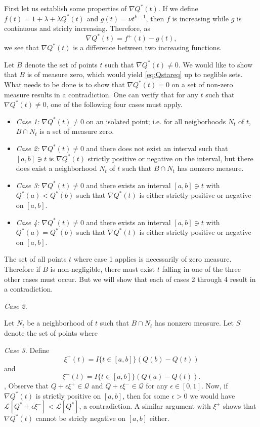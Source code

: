 \documentclass[12pt]{article}
\begin{document}
First let us establish some properties of $\nabla Q^*(t)$.  
If we define $f(t) = 1+ \lambda + \lambda Q^*(t)$
and $g(t) = \nu t^{k-1}$, then $f$ is increasing while $g$ is continuous and stricly increasing.
Therefore, as
\[
\nabla Q^*(t) = f^+(t) - g(t),
\]
we see that $\nabla Q^*(t)$ is a difference between two increasing
functions.






Let $B$ denote the set of points $t$ such that $\nabla Q^*(t) \neq 0$.
We would like to show that $B$ is of measure zero, which would
yield \eqref{eq:Qstareq} up to neglible sets.  What needs to be done
is to show that $\nabla Q^*(t) = 0$ on a set of non-zero measure
results in a contradiction.  One can verify that for any $t$ such that
$\nabla Q^*(t) \neq 0$, one of the following four cases must apply.
\begin{itemize}
\item \emph{Case 1:} $\nabla Q^*(t) \neq 0$ on an isolated point; i.e. for all neigborhoods $N_t$ of $t$, $B \cap N_t$ is a set of measure zero.
\item \emph{Case 2:} $\nabla Q^*(t) \neq 0$ and there does not exist an interval such that
$[a, b] \ni t$ is $\nabla Q^*(t)$ strictly positive or negative on the
interval, but there does exist a neighborhood $N_t$ of $t$ such that $B \cap N_t$ has nonzero measure.
\item \emph{Case 3:}  $\nabla Q^*(t) \neq 0$ and there exists an interval
 $[a, b] \ni t$ with $Q^*(a) < Q^*(b)$ such that $\nabla Q^*(t)$ is
 either strictly positive or negative on $[a,b]$.
\item \emph{Case 4:} $\nabla Q^*(t) \neq 0$ and there exists an interval
 $[a, b] \ni t$ with $Q^*(a) = Q^*(b)$ such that $\nabla Q^*(t)$ is
 either strictly positive or negative on $[a,b]$.
\end{itemize}
The set of all points $t$ where case 1 applies is necessarily of zero
measure.  Therefore if $B$ is non-negligible, there must exist $t$
falling in one of the three other cases must occur.  But we will show that 
each of cases 2 through 4 result in a contradiction.

\emph{Case 2.}


Let $N_t$ be a neighborhood of $t$ such that $B \cap N_t$ has nonzero
measure.  Let $S$ denote the set of points where 


\emph{Case 3.}
Define
\[
\xi^+(t) = I\{t \in [a,b]\} (Q(b) - Q(t))
\]
and
\[
\xi^-(t) = I\{t \in [a,b]\} (Q(a) - Q(t)).
\],
Observe that $Q + \epsilon \xi^+ \in \mathcal{Q}$ and $Q
+ \epsilon \xi^- \in \mathcal{Q}$ for any $\epsilon \in [0,1]$.  Now,
if $\nabla Q^*(t)$ is strictly positive on $[a,b]$, then for some
$\epsilon > 0$ we would have $\mathcal{L}[Q^* + \epsilon \xi^-]
< \mathcal{L}[Q^*]$, a contradiction.  A similar argument with $\xi^+$
shows that $\nabla Q^*(t)$ cannot be stricly negative on $[a, b]$
either.
\end{document}
